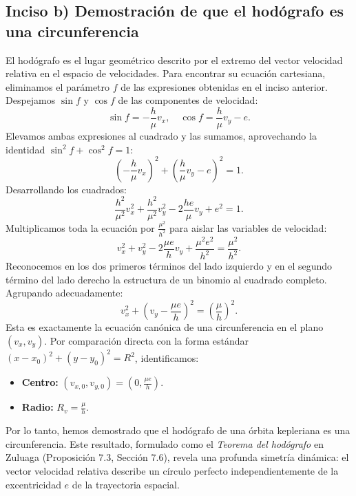 \documentclass[12pt, a4paper]{article}
\begin{document}
\subsection*{Inciso b) Demostración de que el hodógrafo es una circunferencia}

El hodógrafo es el lugar geométrico descrito por el extremo del vector velocidad relativa en el espacio de velocidades. Para encontrar su ecuación cartesiana, eliminamos el parámetro $f$ de las expresiones obtenidas en el inciso anterior. Despejamos $\sin f$ y $\cos f$ de las componentes de velocidad:
$$
\sin f = -\frac{h}{\mu} v_x, \quad \cos f = \frac{h}{\mu} v_y - e.
$$
Elevamos ambas expresiones al cuadrado y las sumamos, aprovechando la identidad $\sin^2 f + \cos^2 f = 1$:
$$
\left( -\frac{h}{\mu} v_x \right)^2 + \left( \frac{h}{\mu} v_y - e \right)^2 = 1.
$$
Desarrollando los cuadrados:
$$
\frac{h^2}{\mu^2} v_x^2 + \frac{h^2}{\mu^2} v_y^2 - 2 \frac{h e}{\mu} v_y + e^2 = 1.
$$
Multiplicamos toda la ecuación por $\frac{\mu^2}{h^2}$ para aislar las variables de velocidad:
$$
v_x^2 + v_y^2 - 2 \frac{\mu e}{h} v_y + \frac{\mu^2 e^2}{h^2} = \frac{\mu^2}{h^2}.
$$
Reconocemos en los dos primeros términos del lado izquierdo y en el segundo término del lado derecho la estructura de un binomio al cuadrado completo. Agrupando adecuadamente:
$$
v_x^2 + \left( v_y - \frac{\mu e}{h} \right)^2 = \left( \frac{\mu}{h} \right)^2.
$$
Esta es exactamente la ecuación canónica de una circunferencia en el plano $(v_x, v_y)$. Por comparación directa con la forma estándar $(x - x_0)^2 + (y - y_0)^2 = R^2$, identificamos:
\begin{itemize}
    \item \textbf{Centro:} $(v_{x,0}, v_{y,0}) = \left( 0, \frac{\mu e}{h} \right)$.
    \item \textbf{Radio:} $R_v = \frac{\mu}{h}$.
\end{itemize}
Por lo tanto, hemos demostrado que el hodógrafo de una órbita kepleriana es una circunferencia. Este resultado, formulado como el \textit{Teorema del hodógrafo} en Zuluaga (Proposición 7.3, Sección 7.6), revela una profunda simetría dinámica: el vector velocidad relativa describe un círculo perfecto independientemente de la excentricidad $e$ de la trayectoria espacial. 
\end{document}
